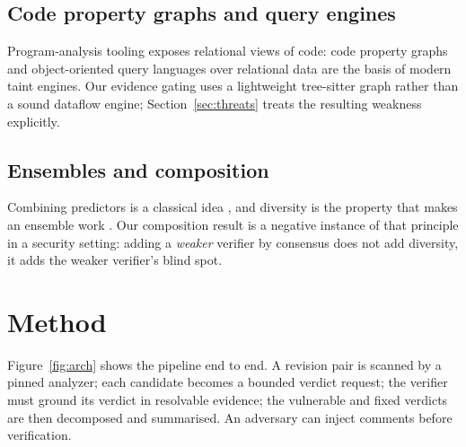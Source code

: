 \documentclass[conference]{IEEEtran}
\begin{document}
\subsection{Code property graphs and query engines}
Program-analysis tooling exposes relational views of code: code property graphs
\cite{yamaguchi2014modeling} and object-oriented query languages over relational
data \cite{avgustinov2016ql} are the basis of modern taint engines. Our evidence
gating uses a lightweight tree-sitter graph rather than a sound dataflow engine;
Section~\ref{sec:threats} treats the resulting weakness explicitly.

\subsection{Ensembles and composition}
Combining predictors is a classical idea \cite{breiman1996bagging}, and diversity is
the property that makes an ensemble work \cite{kuncheva2003measures}. Our
composition result is a negative instance of that principle in a security setting:
adding a \emph{weaker} verifier by consensus does not add diversity, it adds the
weaker verifier's blind spot.

\section{Method}
Figure~\ref{fig:arch} shows the pipeline end to end. A revision pair is scanned
by a pinned analyzer; each candidate becomes a bounded verdict request; the verifier
must ground its verdict in resolvable evidence; the vulnerable and fixed verdicts are
then decomposed and summarised. An adversary can inject comments before verification.
\end{document}
